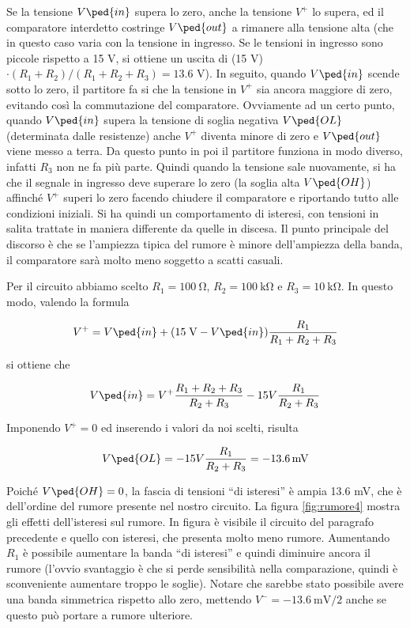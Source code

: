 Se la tensione $V\ped{in}$ supera lo zero, anche la tensione $V^+$ lo supera, ed il comparatore interdetto costringe
$V\ped{out}$ a rimanere alla tensione alta (che in questo caso varia con la tensione in ingresso. Se le tensioni in ingresso
sono piccole rispetto a 15 V, si ottiene un uscita di (15 V)$\cdot(R_1 + R_2)/(R_1 + R_2 + R_3) = 13.6$ V). In seguito, quando $V\ped{in}$ scende
sotto lo zero, il partitore fa si che la tensione in $V^+$ sia ancora maggiore di zero, evitando così la commutazione del comparatore.
Ovviamente ad un certo punto, quando $V\ped{in}$ supera la tensione di soglia negativa $V\ped{OL}$ (determinata dalle resistenze)
anche $V^+$ diventa minore di zero e $V\ped{out}$ viene messo a terra. Da questo punto in poi il partitore funziona in modo
diverso, infatti $R_3$ non ne fa più parte. Quindi quando la tensione sale nuovamente, si ha che il segnale in ingresso deve
superare lo zero (la soglia alta $V\ped{OH}$) affinché $V^+$ superi lo zero facendo chiudere il comparatore e riportando tutto alle condizioni iniziali.
Si ha quindi un comportamento di isteresi, con tensioni in salita trattate in maniera differente da quelle in discesa.
Il punto principale del discorso è che se l'ampiezza tipica del rumore è minore dell'ampiezza della banda, il comparatore
sarà molto meno soggetto a scatti casuali.

Per il circuito abbiamo scelto $R_1 = \SI{100}{\ohm}$, $R_2 = \SI{100}{\kilo\ohm}$ e $R_3 = \SI{10}{\kilo\ohm}$.
In questo modo, valendo la formula

\begin{equation}
    V^+ = V\ped{in} + (15\;\text{V} - V\ped{in}) \frac{R_1}{R_1+R_2+R_3}
\end{equation}

si ottiene che

\begin{equation}
    V\ped{in} = V^+ \frac{R_1+R_2+R_3}{R_2+R_3} - 15 V \frac{R_1}{R_2+R_3}
\end{equation}

Imponendo $V^+ = 0$ ed inserendo i valori da noi scelti, risulta

\begin{equation}
    V\ped{OL} = - 15 V \frac{R_1}{R_2+R_3} = -\SI{13.6}{\milli\volt}
\end{equation}

Poiché $V\ped{OH} = 0$, la fascia di tensioni ``di isteresi'' è ampia 13.6 mV, 
che è dell'ordine del rumore presente nel nostro circuito. La figura \ref{fig:rumore4} mostra gli effetti dell'isteresi
sul rumore. In figura è visibile il circuito del paragrafo precedente e quello con isteresi, che presenta molto meno rumore.
Aumentando $R_1$ è possibile aumentare la banda ``di isteresi'' e quindi diminuire ancora il rumore (l'ovvio svantaggio è che
si perde sensibilità nella comparazione, quindi è sconveniente aumentare troppo le soglie).
Notare che sarebbe stato possibile avere una banda simmetrica rispetto allo zero, mettendo $V^- = -\SI{13.6}{\milli\volt}/2$
anche se questo può portare a rumore ulteriore.

